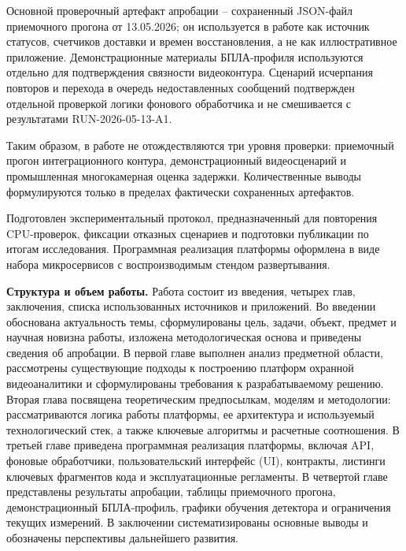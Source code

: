 Основной проверочный артефакт апробации -- сохраненный JSON-файл приемочного прогона от 13.05.2026; он используется в работе как источник статусов, счетчиков доставки и времен восстановления, а не как иллюстративное приложение. Демонстрационные материалы БПЛА-профиля используются отдельно для подтверждения связности видеоконтура. Сценарий исчерпания повторов и перехода в очередь недоставленных сообщений подтвержден отдельной проверкой логики фонового обработчика и не смешивается с результатами RUN-2026-05-13-A1.

Таким образом, в работе не отождествляются три уровня проверки: приемочный прогон интеграционного контура, демонстрационный видеосценарий и промышленная многокамерная оценка задержки. Количественные выводы формулируются только в пределах фактически сохраненных артефактов.

Подготовлен экспериментальный протокол, предназначенный для повторения CPU-проверок, фиксации отказных сценариев и подготовки публикации по итогам исследования. Программная реализация платформы оформлена в виде набора микросервисов с воспроизводимым стендом развертывания.

\textbf{Структура и объем работы.} Работа состоит из введения, четырех глав, заключения, списка использованных источников и приложений. Во введении обоснована актуальность темы, сформулированы цель, задачи, объект, предмет и научная новизна работы, изложена методологическая основа и приведены сведения об апробации. В первой главе выполнен анализ предметной области, рассмотрены существующие подходы к построению платформ охранной видеоаналитики и сформулированы требования к разрабатываемому решению. Вторая глава посвящена теоретическим предпосылкам, моделям и методологии: рассматриваются логика работы платформы, ее архитектура и используемый технологический стек, а также ключевые алгоритмы и расчетные соотношения. В третьей главе приведена программная реализация платформы, включая API, фоновые обработчики, пользовательский интерфейс (UI), контракты, листинги ключевых фрагментов кода и эксплуатационные регламенты. В четвертой главе представлены результаты апробации, таблицы приемочного прогона, демонстрационный БПЛА-профиль, графики обучения детектора и ограничения текущих измерений. В заключении систематизированы основные выводы и обозначены перспективы дальнейшего развития.
